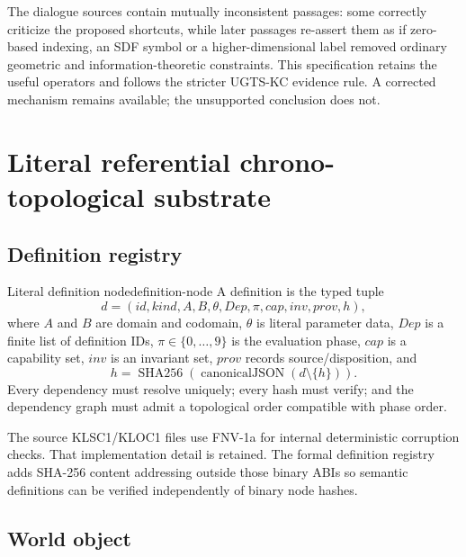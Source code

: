 \documentclass[10pt,a4paper]{article}
\begin{document}
\begin{correctionbox}
The dialogue sources contain mutually inconsistent passages: some correctly criticize the proposed shortcuts, while later passages re-assert them as if zero-based indexing, an SDF symbol or a higher-dimensional label removed ordinary geometric and information-theoretic constraints. This specification retains the useful operators and follows the stricter UGTS-KC evidence rule. A corrected mechanism remains available; the unsupported conclusion does not.
\end{correctionbox}

\section{Literal referential chrono-topological substrate}
\label{sec:core}

\subsection{Definition registry}

\begin{formaldef}{Literal definition node}{definition-node}
A definition is the typed tuple
\[
d=(id,kind,A,B,\theta,Dep,\pi,cap,inv,prov,h),
\]
where \(A\) and \(B\) are domain and codomain, \(\theta\) is literal parameter data, \(Dep\) is a finite list of definition IDs, \(\pi\in\{0,\ldots,9\}\) is the evaluation phase, \(cap\) is a capability set, \(inv\) is an invariant set, \(prov\) records source/disposition, and
\[
h=\operatorname{SHA256}(\operatorname{canonicalJSON}(d\setminus\{h\})).
\]
Every dependency must resolve uniquely; every hash must verify; and the dependency graph must admit a topological order compatible with phase order.
\end{formaldef}

The source KLSC1/KLOC1 files use FNV-1a for internal deterministic corruption checks. That implementation detail is retained. The formal definition registry adds SHA-256 content addressing outside those binary ABIs so semantic definitions can be verified independently of binary node hashes.

\subsection{World object}
\end{document}
